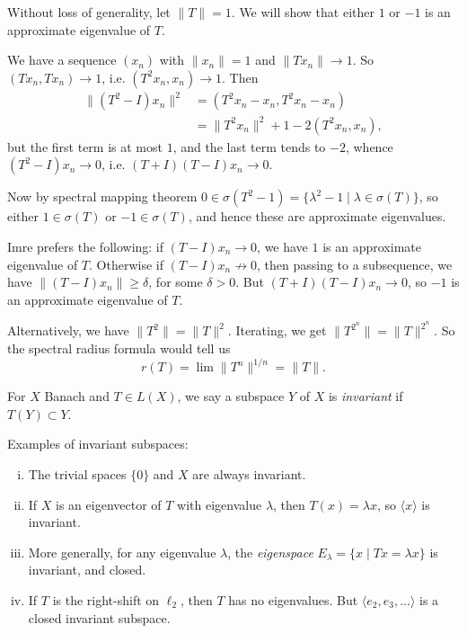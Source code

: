 \documentclass[12pt]{article}
\begin{document}
\begin{proofbox}
	Without loss of generality, let $\|T\| = 1$. We will show that either $1$ or $-1$ is an approximate eigenvalue of $T$.

	We have a sequence $(x_n)$ with $\|x_n\| = 1$ and $\|T x_n\| \to 1$. So $(Tx_n, T x_n) \to 1$, i.e. $(T^2 x_n, x_n) \to 1$. Then
	\begin{align*}
		\|(T^2 - I)x_n\|^2 &= (T^2 x_n - x_n, T^2 x_n - x_n) \\
				   &= \|T^2 x_n\|^2 + 1 - 2(T^2 x_n, x_n),
	\end{align*}
	but the first term is at most $1$, and the last term tends to $-2$, whence $(T^2 - I)x_n \to 0$, i.e. $(T+I)(T-I)x_n \to 0$.

	Now by spectral mapping theorem $0 \in \sigma(T^2 - 1) = \{\lambda^2 - 1 \mid \lambda \in \sigma(T)\}$, so either $1 \in \sigma(T)$ or $-1 \in \sigma(T)$, and hence these are approximate eigenvalues.

	Imre prefers the following: if $(T - I)x_n \to 0$, we have $1$ is an approximate eigenvalue of $T$. Otherwise if $(T - I)x_n \not \to 0$, then passing to a subsequence, we have $\|(T-I)x_n\| \geq \delta$, for some $\delta > 0$. But $(T+I)(T-I)x_n \to 0$, so $-1$ is an approximate eigenvalue of $T$.
\end{proofbox}

\begin{remark}
	Alternatively, we have $\|T^2\| = \|T\|^2$. Iterating, we get $\|T^{2^n}\| = \|T\|^{2^n}$. So the spectral radius formula would tell us
	\[
	r(T) = \lim \|T^{n}\|^{1/n} = \|T\|.
	\]
\end{remark}

For $X$ Banach and $T \in L(X)$, we say a subspace $Y$ of $X$ is \emph{invariant} if $T(Y) \subset Y$.

\begin{exbox}
	Examples of invariant subspaces:
	\begin{enumerate}[(i)]
		\item The trivial spaces $\{0\}$ and $X$ are always invariant.
		\item If $X$ is an eigenvector of $T$ with eigenvalue $\lambda$, then $T(x) = \lambda x$, so $\langle x \rangle$ is invariant.
		\item More generally, for any eigenvalue $\lambda$, the \emph{eigenspace} $E_\lambda = \{x \mid Tx = \lambda x\}$ is invariant, and closed.
		\item If $T$ is the right-shift on $\ell_2$, then $T$ has no eigenvalues. But $\langle e_2, e_3, \ldots \rangle$ is a closed invariant subspace.
	\end{enumerate}
\end{exbox}
\end{document}
